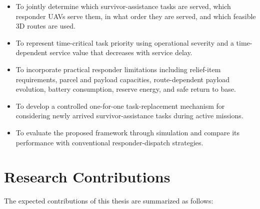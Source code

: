 \begin{itemize}
    \item To jointly determine which survivor-assistance tasks are served,
    which responder UAVs serve them, in what order they are served, and which
    feasible 3D routes are used.

    \item To represent time-critical task priority using operational severity
    and a time-dependent service value that decreases with service delay.

    \item To incorporate practical responder limitations including relief-item
    requirements, parcel and payload capacities, route-dependent payload
    evolution, battery consumption, reserve energy, and safe return to base.

    \item To develop a controlled one-for-one task-replacement mechanism for
    considering newly arrived survivor-assistance tasks during active missions.

    \item To evaluate the proposed framework through simulation and compare its
    performance with conventional responder-dispatch strategies.
\end{itemize}

\section{Research Contributions}

The expected contributions of this thesis are summarized as follows:


